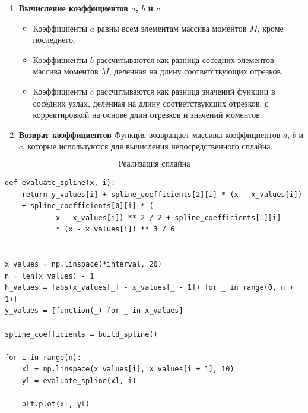 \documentclass{article}
\begin{document}
\begin{enumerate}
    \item \textbf{Вычисление коэффициентов \( a \), \( b \) и \( c \)}
    \begin{itemize}
        \item Коэффициенты \( a \) равны всем элементам массива моментов \( M \), кроме последнего.
        \item Коэффициенты \( b \) рассчитываются как разница соседних элементов массива моментов \( M \), деленная на длину соответствующих отрезков.
        \item Коэффициенты \( c \) рассчитываются как разница значений функции в соседних узлах, деленная на длину соответствующих отрезков, с корректировкой на основе длин отрезков и значений моментов.
    \end{itemize}

    \item \textbf{Возврат коэффициентов}
    Функция возвращает массивы коэффициентов \( a \), \( b \) и \( c \), которые используются для вычисления непосредственного сплайна.
    
\end{enumerate}
$$\textbf{Реализация сплайна}$$
\begin{lstlisting}
def evaluate_spline(x, i):
    return y_values[i] + spline_coefficients[2][i] * (x - x_values[i]) 
    + spline_coefficients[0][i] * (
            x - x_values[i]) ** 2 / 2 + spline_coefficients[1][i] 
            * (x - x_values[i]) ** 3 / 6


x_values = np.linspace(*interval, 20)
n = len(x_values) - 1
h_values = [abs(x_values[_] - x_values[_ - 1]) for _ in range(0, n + 1)]
y_values = [function(_) for _ in x_values]

spline_coefficients = build_spline()

for i in range(n):
    xl = np.linspace(x_values[i], x_values[i + 1], 10)
    yl = evaluate_spline(xl, i)

    plt.plot(xl, yl)
\end{lstlisting}
\end{document}
